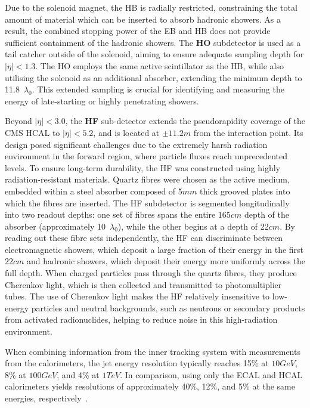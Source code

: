 Due to the solenoid magnet, the \ac{HB} is radially restricted, constraining the total amount of material which can be inserted to absorb hadronic showers. As a result, the combined stopping power of the EB and \ac{HB} does not provide sufficient containment of the hadronic showers. The \textbf{\ac{HO}} subdetector is used as a tail catcher outside of the solenoid, aiming to ensure adequate sampling depth for $|\eta| < 1.3$. The \ac{HO} employs the same active scintillator as the \ac{HB}, while also utilising the solenoid as an additional absorber, extending the minimum depth to 11.8~$\lambda_0$. This extended sampling is crucial for identifying and measuring the energy of late-starting or highly penetrating showers.

Beyond $|\eta| < 3.0$, the \textbf{\ac{HF}} sub-detector extends the pseudorapidity coverage of the \ac{CMS} \ac{HCAL} to $|\eta| < 5.2$, and is located at $\pm 11.2\unit{m}$ from the interaction point. Its design posed significant challenges due to the extremely harsh radiation environment in the forward region, where particle fluxes reach unprecedented levels. To ensure long-term durability, the \ac{HF} was constructed using highly radiation-resistant materials. Quartz fibres were chosen as the active medium, embedded within a steel absorber composed of 5$\unit{mm}$ thick grooved plates into which the fibres are inserted. The \ac{HF} subdetector is segmented longitudinally into two readout depths: one set of fibres spans the entire 165$\unit{cm}$ depth of the absorber (approximately 10~$\lambda_0$), while the other begins at a depth of 22$\unit{cm}$. By reading out these fibre sets independently, the \ac{HF} can discriminate between electromagnetic showers, which deposit a large fraction of their energy in the first $22\unit{cm}$ and hadronic showers, which deposit their energy more uniformly across the full depth. When charged particles pass through the quartz fibres, they produce Cherenkov light, which is then collected and transmitted to photomultiplier tubes. The use of Cherenkov light makes the \ac{HF} relatively insensitive to low-energy particles and neutral backgrounds, such as neutrons or secondary products from activated radionuclides, helping to reduce noise in this high-radiation environment.

When combining information from the inner tracking system with measurements from the calorimeters, the jet energy resolution typically reaches 15\% at $10\unit{GeV}$, 8\% at $100\unit{GeV}$, and 4\% at $1\unit{TeV}$. In comparison, using only the \ac{ECAL} and \ac{HCAL} calorimeters yields resolutions of approximately 40\%, 12\%, and 5\% at the same energies, respectively~\cite{CMS_HCAL_EnergyResolution}.

